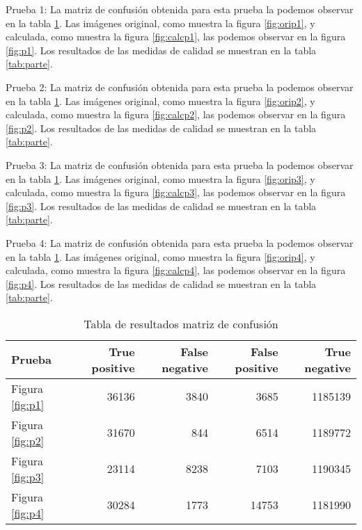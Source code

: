 Prueba 1: La matriz de confusión obtenida para esta prueba la podemos observar en la tabla \ref{tab:pruebas}.
Las imágenes original, como muestra la figura \ref{fig:orip1}, y calculada, como muestra la figura \ref{fig:calcp1}, las podemos observar en la figura \ref{fig:p1}.
Los resultados de las medidas de calidad se muestran en la tabla \ref{tab:parte}.

Prueba 2: La matriz de confusión obtenida para esta prueba la podemos observar en la tabla \ref{tab:pruebas}.
Las imágenes original, como muestra la figura \ref{fig:orip2}, y calculada, como muestra la figura \ref{fig:calcp2}, las podemos observar en la figura \ref{fig:p2}.
Los resultados de las medidas de calidad se muestran en la tabla \ref{tab:parte}.

Prueba 3: La matriz de confusión obtenida para esta prueba la podemos observar en la tabla \ref{tab:pruebas}.
Las imágenes original, como muestra la figura \ref{fig:orip3}, y calculada, como muestra la figura \ref{fig:calcp3}, las podemos observar en la figura \ref{fig:p3}.
Los resultados de las medidas de calidad se muestran en la tabla \ref{tab:parte}.

Prueba 4: La matriz de confusión obtenida para esta prueba la podemos observar en la tabla \ref{tab:pruebas}.
Las imágenes original, como muestra la figura \ref{fig:orip4}, y calculada, como muestra la figura \ref{fig:calcp4}, las podemos observar en la figura \ref{fig:p4}.
Los resultados de las medidas de calidad se muestran en la tabla \ref{tab:parte}.




\begin{table}[]
\centering
\caption{Tabla de resultados matriz de confusión}
\label{tab:pruebas}
\begin{tabular}{@{} lrrrr @{}}
\hline
Prueba                & True positive & False negative & False positive & True negative \\ \hline
Figura \ref{fig:p1} & 36136         & 3840           & 3685           & 1185139       \\ \hline
Figura \ref{fig:p2} & 31670         & 844            & 6514           & 1189772       \\ \hline
Figura \ref{fig:p3} & 23114         & 8238           & 7103           & 1190345       \\ \hline
Figura \ref{fig:p4} & 30284         & 1773           & 14753          & 1181990       \\ \hline
\end{tabular}
\end{table}




